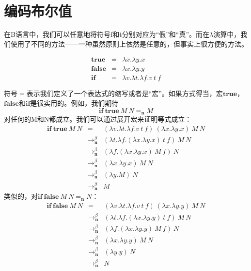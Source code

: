 \documentclass{book}
\begin{document}
\section{编码布尔值}
在B语言中，我们可以任意地将符号f和t分别对应为“假”和“真”。而在$\lambda$演算中，我们使用了不同的方法——一种虽然原则上依然是任意的，但事实上很方便的方法。
\begin{framed}
 $$
 \begin{array}{lll}
 \mathbf{true} & \stackrel{.}{=} & \lambda x.\lambda y.x \\
 \mathbf{false} & \stackrel{.}{=} & \lambda x.\lambda y.y \\
 \mathbf{if} & \stackrel{.}{=} & \lambda v.\lambda t.\lambda f.v\ t\ f
 \end{array}
  $$
\end{framed}
符号$\stackrel{.}{=}$表示我们定义了一个表达式的缩写或者是“宏”。如果方式得当，宏$\mathbf{true}$，$\mathbf{false}$和$\mathbf{if}$是很实用的。例如，我们期待
$$
\mathbf{if}\ \mathbf{true}\ M\ N=_\textbf{n}M
$$
对任何的M和N都成立。我们可以通过展开宏来证明等式成立：\\
$$
\begin{array}{lll}
  \mathbf{if}\ \mathbf{true}\ M\ N & = & (\lambda v.\lambda t.\lambda f.v\ t\ f)\ (\lambda x.\lambda y.x)\ M\ N\\
  & \rightarrow_\textbf{n}^\beta & (\lambda t.\lambda f.(\lambda x.\lambda y.x)\ t\ f)\ M\ N\\
  & \rightarrow_\textbf{n}^\beta & (\lambda f.(\lambda x.\lambda y.x)\ M\ f)\ N\\
  & \rightarrow_\textbf{n}^\beta & (\lambda x.\lambda y.x)\ M\ N\\
  & \rightarrow_\textbf{n}^\beta & (\lambda y.M)\ N\\
  & \rightarrow_\textbf{n}^\beta & M
\end{array}
$$
类似的，对$\mathbf{if}\ \mathbf{false}\ M\ N=_\textbf{n}N$：
$$
\begin{array}{lll}
  \mathbf{if}\ \mathbf{false}\ M\ N & = & (\lambda v.\lambda t.\lambda f.v\ t\ f)\ (\lambda x.\lambda y.y)\ M\ N\\
  & \rightarrow_\textbf{n}^\beta & (\lambda t.\lambda f.(\lambda x.\lambda y.y)\ t\ f)\ M\ N\\
  & \rightarrow_\textbf{n}^\beta & (\lambda f.(\lambda x.\lambda y.y)\ M\ f)\ N\\
  & \rightarrow_\textbf{n}^\beta & (\lambda x.\lambda y.y)\ M\ N\\
  & \rightarrow_\textbf{n}^\beta & (\lambda y.y)\ N\\
  & \rightarrow_\textbf{n}^\beta & N
\end{array}
$$
\end{document}
